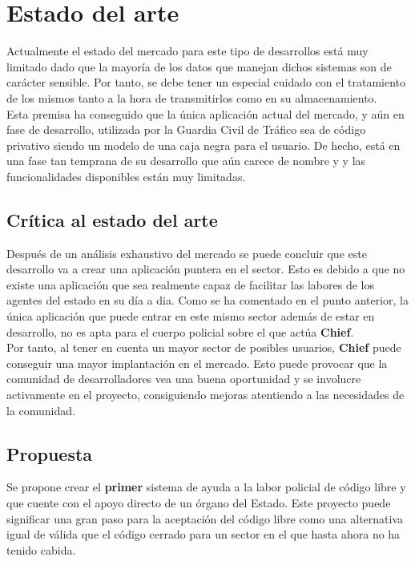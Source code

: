 \chapter{Estado del arte}

Actualmente el estado del mercado para este tipo de desarrollos está muy limitado dado que 
la mayoría de los datos que manejan dichos sistemas son de carácter sensible. Por tanto, se 
debe tener un especial cuidado con el tratamiento de los mismos tanto a la hora de transmitirlos
como en su almacenamiento.\\

Esta premisa ha conseguido que la única aplicación actual del mercado, y aún en fase de desarrollo,
utilizada por la Guardia Civil de Tráfico sea de código privativo siendo un modelo de una caja negra
para el usuario. De hecho, está en una fase tan temprana de su desarrollo que aún carece de nombre y 
y las funcionalidades disponibles están muy limitadas.\\ 



\section{Crítica al estado del arte}

Después de un análisis exhaustivo del mercado se puede concluir que este desarrollo va a crear
una aplicación puntera en el sector. Esto es debido a que no existe una aplicación que sea
realmente capaz de facilitar las labores de los agentes del estado en su día a dia. Como se 
ha comentado en el punto anterior, la única aplicación que puede entrar en este mismo sector
además de estar en desarrollo, no es apta para el cuerpo policial sobre el que actúa \textbf{Chief}.\\ 

Por tanto, al tener en cuenta un mayor sector de posibles usuarios, \textbf{Chief} puede conseguir 
una mayor implantación en el mercado. Esto puede provocar que la comunidad de desarrolladores vea
una buena oportunidad y se involucre activamente en el proyecto, consiguiendo mejoras atentiendo a
las necesidades de la comunidad.

\section{Propuesta}

Se propone crear el \textbf{primer} sistema de ayuda a la labor policial de código libre y que cuente
con el apoyo directo de un órgano del Estado. Este proyecto puede significar una gran paso para la aceptación 
del código libre como una alternativa igual de válida que el código cerrado para un sector en el 
que hasta ahora no ha tenido cabida.\\   